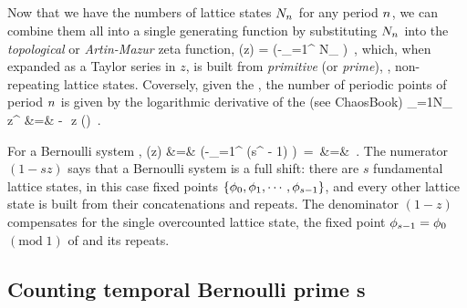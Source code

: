 \subsection{\Tzeta}
\label{s:bernZeta}

Now that we have the numbers of lattice states $N_{{n_{}}}$ for any
period ${n_{}}$, we can combine them all into a single generating function by
substituting $N_{{n_{}}}$ into the {\em topological} or {\em Artin-Mazur}
zeta func\-tion,
\beq
\zetatop(z) =
     \exp\left(-\sum_{\cl{}=1}^\infty
{} N_\cl{}
         \right)
\,,
which, when expanded as a Taylor series in $z$, is built from
\emph{primitive} (or \emph{prime}), \ie, non-repeating lattice
states. Coversely, given the \tzeta, the number of periodic
points of period $\cl{}$ is given by the logarithmic derivative of the
{\tzeta} (see
{ChaosBook})
\bea
\sum_{\cl{}=1}N_\cl{} z^\cl{}
    &=& - \,\,z (\zetatop)
\,.
\label{zetatop-N}
\eea

For a Bernoulli system ,
\bea
\zetatop(z)
 &=&  \exp \left(-\sum_{\cl{}=1}^\infty
{} ({s}^\cl{} - 1)
         \right)
\,=\,
\exp \left[\ln(1 -  {s}z) - \ln(1 - z) \right]
\continue
 &=&
\,.
\label{BernZeta}
\eea
The numerator $(1 - {s}z)$ says that a Bernoulli system is a full
shift: there are $s$ fundamental lattice states, in this case
fixed points $\{\phi_0,\phi_1,\cdots,\phi_{s-1}\}$, and every other
lattice state is built from their concatenations and repeats. The
denominator $(1 - z)$ compensates for the single overcounted lattice
state, the fixed point $\phi_{{s}-1}=\phi_{0}$ $(\mbox{mod}\;1)$ of
 and its repeats.

\subsection{Counting {temporal Bernoulli} prime \po s}
\label{s:bernPrime}

